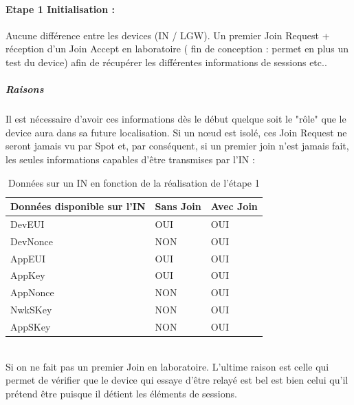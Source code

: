 \documentclass[a4paper, 11pt]{article}
\begin{document}
\paragraph{Etape 1 Initialisation :}  Aucune différence entre les devices (IN / LGW). Un premier Join Request + réception d'un Join Accept en laboratoire ( fin de conception : permet en plus un test du device) afin de récupérer les différentes informations de sessions etc.. \\
\subparagraph{Raisons}
Il est nécessaire d'avoir ces informations dès le début quelque soit le "rôle" que le device aura dans sa future localisation. Si un n\oe{}ud est isolé, ces Join Request ne seront jamais vu par Spot et, par conséquent, si un premier join n'est jamais fait, les seules informations capables d'être transmises par l'IN : \\
\begin{table}[!ht]
\centering
\caption{Données sur un IN en fonction de la réalisation de l'étape 1}
\label{Données sur un IN en fonction de la réalisation de l'étape 1}
\begin{tabular}{|l|l|l|}
\hline
Données disponible sur l'IN & Sans Join                   & Avec Join                   \\ \hline
DevEUI                     & \cellcolor[HTML]{32CB00}OUI & \cellcolor[HTML]{32CB00}OUI \\ \hline
DevNonce                   & \cellcolor[HTML]{FD6864}NON & \cellcolor[HTML]{32CB00}OUI \\ \hline
AppEUI                     & \cellcolor[HTML]{32CB00}OUI & \cellcolor[HTML]{32CB00}OUI \\ \hline
AppKey                     & \cellcolor[HTML]{32CB00}OUI & \cellcolor[HTML]{32CB00}OUI \\ \hline
AppNonce                   & \cellcolor[HTML]{FD6864}NON & \cellcolor[HTML]{32CB00}OUI \\ \hline
NwkSKey                    & \cellcolor[HTML]{FD6864}NON & \cellcolor[HTML]{32CB00}OUI \\ \hline
AppSKey                    & \cellcolor[HTML]{FD6864}NON & \cellcolor[HTML]{32CB00}OUI \\ \hline
\end{tabular}
\end{table}
\\
Si on ne fait pas un premier Join en laboratoire. L'ultime raison est celle qui permet de vérifier que le device qui essaye d'être relayé est bel est bien celui qu'il prétend être puisque il détient les éléments de sessions.
\end{document}
